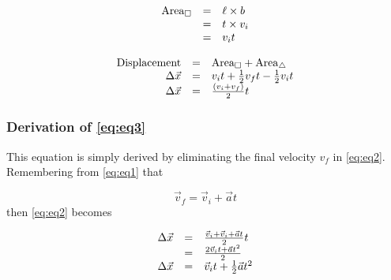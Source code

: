    \begin{equation*}
    \begin{array}{ccc}\hfill {\text{Area}}_{\square }& =& \ell \ensuremath{\times}b\hfill \\ & =& t\ensuremath{\times}{v}_{i}\hfill \\ & =& {v}_{i}t\hfill \end{array}
      \end{equation*}
          \label{m38796*id76700}\nopagebreak\noindent{}
            
    \begin{equation*}
    \begin{array}{ccc}\hfill \text{Displacement}& =& {\text{Area}}_{\square }+{\text{Area}}_{\triangle}\hfill \\ \hfill \Delta \vec{x}& =& {v}_{i}t+\frac{1}{2}{v}_{f}t-\frac{1}{2}{v}_{i}t\hfill \\ \hfill \Delta \vec{x}& =& \frac{\left({v}_{i}+{v}_{f}\right)}{2}t\hfill \end{array}
      \end{equation*}
        \label{m38796*uid137}
            \subsubsection*{Derivation of \ref{eq:eq3}}
            \nopagebreak
          \label{m38796*id76865}This equation is simply derived by eliminating the final velocity ${v}_{f}$ in  \ref{eq:eq2}. Remembering from   \ref{eq:eq1} that\par 
          \label{m38796*id76891}\nopagebreak\noindent{}
            
    \begin{equation*}
    \vec{v}_{f}=\vec{v}_{i}+\vec{a}t
      \end{equation*}
          \label{m38796*id76925}then  \ref{eq:eq2} becomes\par 
          \label{m38796*id76932}\nopagebreak\noindent{}
            
    \begin{equation*}
    \begin{array}{ccc}\hfill \Delta \vec{x}& =& \frac{\vec{v}_{i}+\vec{v}_{i}+\vec{a}t}{2}t\hfill \\ & =& \frac{2\vec{v}_{i}t+\vec{a}{t}^{2}}{2}\hfill \\ \hfill \Delta \vec{x}& =& \vec{v}_{i}t+\frac{1}{2}\vec{a}{t}^{2}\hfill \end{array}
      \end{equation*}
        \label{m38796*uid138}
